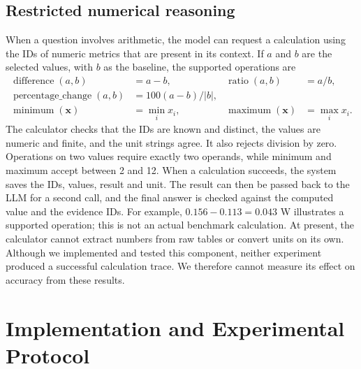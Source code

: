 \documentclass[11pt,a4paper]{article}
\begin{document}
\subsection{Restricted numerical reasoning}
When a question involves arithmetic, the model can request a calculation using the IDs of numeric metrics that are present in its context. If $a$ and $b$ are the selected values, with $b$ as the baseline, the supported operations are
\begin{align}
\operatorname{difference}(a,b)&=a-b, & \operatorname{ratio}(a,b)&=a/b,\\
\operatorname{percentage\_change}(a,b)&=100(a-b)/|b|,\\
\operatorname{minimum}(\mathbf{x})&=\min_i x_i, & \operatorname{maximum}(\mathbf{x})&=\max_i x_i.
\end{align}
The calculator checks that the IDs are known and distinct, the values are numeric and finite, and the unit strings agree. It also rejects division by zero. Operations on two values require exactly two operands, while minimum and maximum accept between 2 and 12. When a calculation succeeds, the system saves the IDs, values, result and unit. The result can then be passed back to the LLM for a second call, and the final answer is checked against the computed value and the evidence IDs. For example, $0.156-0.113=0.043$ W illustrates a supported operation; this is not an actual benchmark calculation. At present, the calculator cannot extract numbers from raw tables or convert units on its own. Although we implemented and tested this component, neither experiment produced a successful calculation trace. We therefore cannot measure its effect on accuracy from these results.
\newpage
\section{Implementation and Experimental Protocol}
\end{document}
